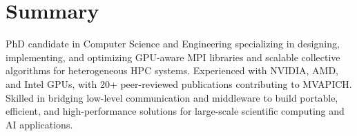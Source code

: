 \documentclass[10pt,a4paper,sans]{moderncv}          %
\begin{document}
\begin{minipage}[t]{0.32\textwidth}

\section{Summary}

PhD candidate in Computer Science and Engineering specializing in designing, implementing, and optimizing GPU-aware MPI libraries and scalable collective algorithms for heterogeneous HPC systems. Experienced with NVIDIA, AMD, and Intel GPUs, with 20+ peer-reviewed publications contributing to MVAPICH. Skilled in bridging low-level communication and middleware to build portable, efficient, and high-performance solutions for large-scale scientific computing and AI applications.





\end{minipage}
\end{document}
